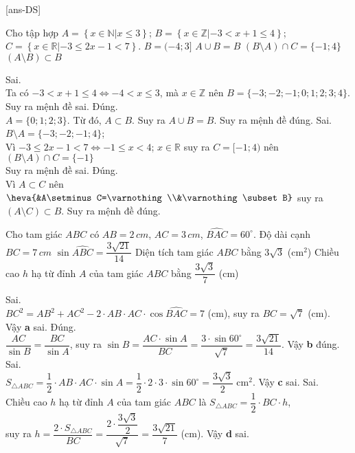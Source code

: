 \cauds

[ans-DS]

\begin{ex}%
	Cho tập hợp $A=\left\{x\in\mathbb{N}|x\leq 3\right\}$; $B=\left\{x\in \mathbb{Z}|-3<x+1\leq 4\right\}$;\\
	$C=\left\{x\in \mathbb{R}|-3\leq 2x-1<7\right\}$.
	\choiceTF
	{$B=(-4;3]$}
	{\True $A\cup B=B$}
	{$(B\setminus A)\cap C=\{-1;4\}$}
	{\True $(A\setminus B)\subset B$}
	\loigiai
	{
		\begin{itemchoice}
			\itemch Sai. \\
			Ta có $-3<x+1\leq 4 \Leftrightarrow -4 <x\leq 3$, mà $x \in\mathbb{Z}$ nên $B=\{-3;-2;-1;0;1;2;3;4\}$. Suy ra mệnh đề sai.
			\itemch Đúng.\\
			$A=\{0;1;2;3\}$. Từ đó, $A \subset B$. Suy ra $A\cup B=B$. Suy ra mệnh đề đúng.
			\itemch Sai.\\
			$ B\setminus A=\{-3;-2;-1;4\}$;\\
			Vì $-3\leq 2x-1<7 \Leftrightarrow -1\leq x<4$; $x\in \mathbb{R}$ suy ra $C=[-1;4)$ nên $(B\setminus A)\cap C=\{-1\}$\\
			Suy ra mệnh đề sai.
			\itemch Đúng.\\
			Vì $A\subset C$ nên $\heva{&A\setminus C=\varnothing \\&\varnothing \subset B}$ suy ra $(A\setminus C) \subset B$. Suy ra mệnh đề đúng.
		\end{itemchoice}
	}
\end{ex}

\begin{ex}%
	Cho tam giác $ABC$ có $AB=2\,cm$, $AC=3\,cm$, $\widehat{BAC}=60^{\circ}$.
	\choiceTF
	{Độ dài cạnh $BC=7\,cm$}
	{$\sin \widehat{ABC}=\dfrac{3\sqrt{21}}{14}$}
	{Diện tích tam giác $ABC$ bằng $3\sqrt{3}$ (cm$^2$)}
	{Chiều cao $h$ hạ từ đỉnh $A$ của tam giác $ABC$ bằng $\dfrac{3\sqrt{3}}{7}$ (cm)}
	\loigiai
	{
		\begin{itemchoice}
			\itemch Sai. \\
			$BC^2=AB^2+AC^2-2\cdot AB\cdot AC\cdot \cos\widehat{BAC}=7$ (cm), suy ra $BC=\sqrt{7}$ (cm).\\ Vậy \textbf{a} sai.
			\itemch Đúng.\\
			$\dfrac{AC}{\sin B}=\dfrac{BC}{\sin A}$, suy ra $\sin B=\dfrac{AC\cdot \sin A}{BC}=\dfrac{3\cdot \sin 60^{\circ}}{\sqrt{7}}=\dfrac{3\sqrt{21}}{14}$. Vậy \textbf{b} đúng.
			\itemch Sai.\\
			$S_{\triangle ABC}=\dfrac{1}{2}\cdot AB\cdot AC\cdot \sin A=\dfrac{1}{2}\cdot 2\cdot 3\cdot \sin 60^{\circ}=\dfrac{3\sqrt{3}}{2}$ cm$^2$. Vậy \textbf{c} sai.
			\itemch Sai.\\
			Chiều cao $h$ hạ từ đỉnh $A$ của tam giác $ABC$ là $S_{\triangle ABC}=\dfrac{1}{2}\cdot BC\cdot h$,\\ suy ra $h=\dfrac{2\cdot S_{\triangle ABC}}{BC}=\dfrac{2\cdot \dfrac{3\sqrt{3}}{2}}{\sqrt{7}}=\dfrac{3\sqrt{21}}{7}$ (cm). Vậy \textbf{d} sai.
		\end{itemchoice}
	}
\end{ex}

